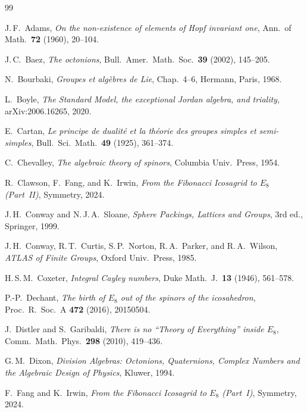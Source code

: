 \documentclass[11pt,reqno]{amsart}
\theoremstyle{plain}
\theoremstyle{definition}
\theoremstyle{remark}
\begin{document}
\begin{thebibliography}{99}

J.\,F.~Adams,
\emph{On the non-existence of elements of Hopf invariant one},
Ann.\ of Math.\ \textbf{72} (1960), 20--104.

J.\,C.~Baez,
\emph{The octonions},
Bull.\ Amer.\ Math.\ Soc.\ \textbf{39} (2002), 145--205.

N.~Bourbaki,
\emph{Groupes et alg\`ebres de Lie},
Chap.\ 4--6, Hermann, Paris, 1968.

L.~Boyle,
\emph{The Standard Model, the exceptional Jordan algebra,
and triality},
arXiv:2006.16265, 2020.

E.~Cartan,
\emph{Le principe de dualit\'e et la th\'eorie des groupes
simples et semi-simples},
Bull.\ Sci.\ Math.\ \textbf{49} (1925), 361--374.

C.~Chevalley,
\emph{The algebraic theory of spinors},
Columbia Univ.\ Press, 1954.

R.~Clawson, F.~Fang, and K.~Irwin,
\emph{From the Fibonacci Icosagrid to $E_8$ (Part~II)},
Symmetry, 2024.

J.\,H.~Conway and N.\,J.\,A.~Sloane,
\emph{Sphere Packings, Lattices and Groups},
3rd ed., Springer, 1999.

J.\,H.~Conway, R.\,T.~Curtis, S.\,P.~Norton,
R.\,A.~Parker, and R.\,A.~Wilson,
\emph{ATLAS of Finite Groups},
Oxford Univ.\ Press, 1985.

H.\,S.\,M.~Coxeter,
\emph{Integral Cayley numbers},
Duke Math.\ J.\ \textbf{13} (1946), 561--578.

P.-P.~Dechant,
\emph{The birth of $E_8$ out of the spinors of the icosahedron},
Proc.\ R.\ Soc.\ A \textbf{472} (2016), 20150504.

J.~Distler and S.~Garibaldi,
\emph{There is no ``Theory of Everything'' inside $E_8$},
Comm.\ Math.\ Phys.\ \textbf{298} (2010), 419--436.

G.\,M.~Dixon,
\emph{Division Algebras: Octonions, Quaternions, Complex
Numbers and the Algebraic Design of Physics},
Kluwer, 1994.

F.~Fang and K.~Irwin,
\emph{From the Fibonacci Icosagrid to $E_8$ (Part~I)},
Symmetry, 2024.


\end{thebibliography}
\end{document}
